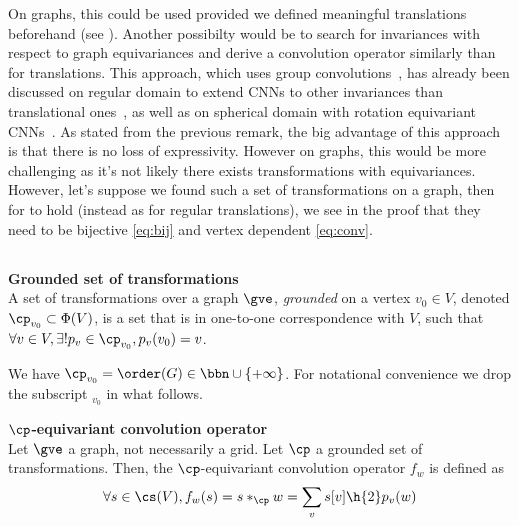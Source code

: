 







On graphs, this could be used provided we defined meaningful translations beforehand (see \secref{}). Another possibilty would be to search for invariances with respect to graph equivariances and derive a convolution operator similarly than for translations. This approach, which uses group convolutions~\citep{weinstein1996groupoids}, has already been discussed on regular domain to extend CNNs to other invariances than translational ones~\citep{cohen2016group,hoogeboom2018hexaconv}, as well as on spherical domain with rotation equivariant CNNs~\citep{cohen2018spherical}. As stated from the previous remark, the big advantage of this approach is that there is no loss of expressivity. However on graphs, this would be more challenging as it's not likely there exists transformations with equivariances. However, let's suppose we found such a set of transformations on a graph, then for  to hold (instead as for regular translations), we see in the proof that they need to be bijective \eqref{eq:bij} and vertex dependent \ref{eq:conv}.




\subsection{}



\begin{definition}\textbf{Grounded set of transformations}\\
A set of transformations over a graph $\gve$, \emph{grounded} on a vertex $v_0 \in V$, denoted $\cp_{v_0} \subset \Phi(V)$, is a set that is in one-to-one correspondence with $V$, such that $\forall v \in V, \exists! p_v \in \cp_{v_0}, p_v(v_0) = v$.
\end{definition}

We have $\cp_{v_0} = \order(G) \in \bbn \cup \{+\infty\}$. For notational convenience we drop the subscript $_{v_0}$ in what follows.

\begin{definition}\textbf{$\cp$-equivariant convolution operator}\\
Let $\gve$ a graph, not necessarily a grid. Let $\cp$ a grounded set of transformations. Then, the  $\cp$-equivariant convolution operator $f_w$ is defined as
\begin{gather*}
\forall s \in \cs(V), f_w(s) = s \ast_{\cp} w = \displaystyle \sum_v s[v] \h{2} p_v(w)
\end{gather*}
\end{definition}

